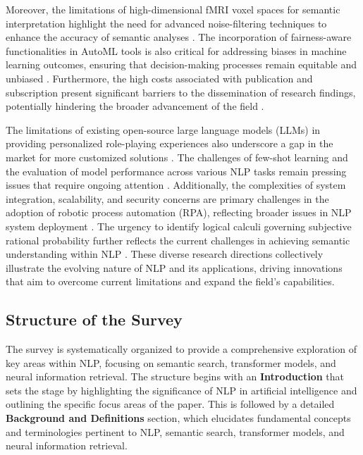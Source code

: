 Moreover, the limitations of high-dimensional fMRI voxel spaces for semantic interpretation highlight the need for advanced noise-filtering techniques to enhance the accuracy of semantic analyses \cite{raposo2019lowdimensionalembodiedsemanticsmusic}. The incorporation of fairness-aware functionalities in AutoML tools is also critical for addressing biases in machine learning outcomes, ensuring that decision-making processes remain equitable and unbiased \cite{narayanan2023democratizecareneedfairness}. Furthermore, the high costs associated with publication and subscription present significant barriers to the dissemination of research findings, potentially hindering the broader advancement of the field \cite{cohen2015costreadingresearchstudy}.



The limitations of existing open-source large language models (LLMs) in providing personalized role-playing experiences also underscore a gap in the market for more customized solutions \cite{tao2024rolecraftglmadvancingpersonalizedroleplaying}. The challenges of few-shot learning and the evaluation of model performance across various NLP tasks remain pressing issues that require ongoing attention \cite{chowdhery2023palm}. Additionally, the complexities of system integration, scalability, and security concerns are primary challenges in the adoption of robotic process automation (RPA), reflecting broader issues in NLP system deployment \cite{pandy2024advancementsroboticsprocessautomation}. The urgency to identify logical calculi governing subjective rational probability further reflects the current challenges in achieving semantic understanding within NLP \cite{cieslinski2022axiomstypefreesubjectiveprobability}. These diverse research directions collectively illustrate the evolving nature of NLP and its applications, driving innovations that aim to overcome current limitations and expand the field's capabilities.



\subsection{Structure of the Survey} \label{subsec:Structure of the Survey}

The survey is systematically organized to provide a comprehensive exploration of key areas within NLP, focusing on semantic search, transformer models, and neural information retrieval. The structure begins with an \textbf{Introduction} that sets the stage by highlighting the significance of NLP in artificial intelligence and outlining the specific focus areas of the paper. This is followed by a detailed \textbf{Background and Definitions} section, which elucidates fundamental concepts and terminologies pertinent to NLP, semantic search, transformer models, and neural information retrieval. 



